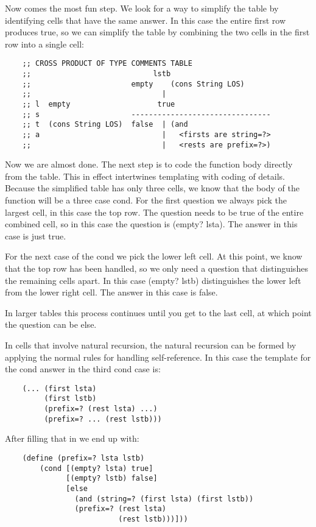 \documentclass[11pt,a4paper]{report}
\begin{document}
	Now comes the most fun step. We look for a way to simplify the table by identifying cells that
	have the same answer. In this case the entire first row produces true, so we can simplify the
	table by combining the two cells in the first row into a single cell:
	
	\begin{verbatim}
	;; CROSS PRODUCT OF TYPE COMMENTS TABLE
	;;                            lstb
	;;                       empty    (cons String LOS)
	;;                              |
	;; l  empty                    true      
	;; s                     --------------------------------
	;; t  (cons String LOS)  false  | (and
	;; a                            |   <firsts are string=?>
	;;                              |   <rests are prefix=?>)
	\end{verbatim}
	
	Now we are almost done. The next step is to code the function body directly from the table. This
	in effect intertwines templating with coding of details. Because the simplified table has only three
	cells, we know that the body of the function will be a three case cond. For the first question we
	always pick the largest cell, in this case the top row. The question needs to be true of the entire
	combined cell, so in this case the question is (empty? lsta). The answer in this case is just
	true.
	
	For the next case of the cond we pick the lower left cell. At this point, we know that the top row
	has been handled, so we only need a question that distinguishes the remaining cells apart. In this
	case (empty? lstb) distinguishes the lower left from the lower right cell. The answer in this
	case is false.
	
	In larger tables this process continues until you get to the last cell, at which point the question
	can be else.
	
	In cells that involve natural recursion, the natural recursion can be formed by applying the normal
	rules for handling self-reference. In this case the template for the cond answer in the third cond
	case is:
	
	\begin{verbatim}
	(... (first lsta)
	     (first lstb)
	     (prefix=? (rest lsta) ...)
	     (prefix=? ... (rest lstb)))
	\end{verbatim}
	
	After filling that in we end up with:
	
	\begin{verbatim}
	(define (prefix=? lsta lstb)
		(cond [(empty? lsta) true]
		      [(empty? lstb) false]
		      [else
		        (and (string=? (first lsta) (first lstb))
		        (prefix=? (rest lsta)
		                  (rest lstb)))]))
	\end{verbatim}
	
\end{document}
